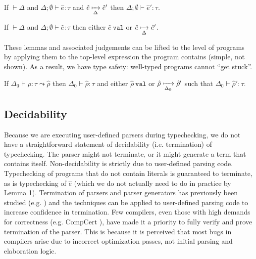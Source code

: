 \begin{lemma}[Preservation]
If $\vdash \Delta$ and $\Delta; \emptyset \vdash \hat{e} : \tau$ and  $\hat{e} \xmapsto[\Delta]{} \hat{e}'$ then $\Delta; \emptyset \vdash \hat{e}' : \tau$.
\end{lemma}
\begin{lemma}[Progress]
If  $\vdash \Delta$ and $\Delta; \emptyset \vdash \hat{e} : \tau$ then either $\hat{e}~\texttt{val}$ or $\hat{e} \xmapsto[\Delta]{} \hat{e}'$.
\end{lemma}
These lemmas and associated judgements can be lifted to the level of programs by applying them to the top-level expression the program contains (simple, not shown). As a result, we have type safety: well-typed programs cannot ``get stuck''.
\begin{theorem}
If $\Delta_0 \vdash \rho : \tau \leadsto \hat{\rho}$ then $\Delta_0 \vdash \hat{\rho} : \tau$ and either $\hat{\rho}~\texttt{val}$ or $\hat{\rho} \xmapsto[\Delta_0]{} \hat{\rho}'$ such that $\Delta_0 \vdash \hat{\rho}' : \tau$.
\end{theorem}
\subsection{Decidability}
Because we are executing user-defined parsers during typechecking, we do not have a straightforward statement of decidability (i.e. termination) of typechecking. The parser might not terminate, or it might generate a term that contains itself. Non-decidability is strictly due to user-defined parsing code. Typechecking of programs that do not contain literals is guaranteed to terminate, as is typechecking of $\hat{e}$ (which we do not actually need to do in practice by Lemma 1). Termination of parsers and parser generators has previously been studied (e.g. \cite{DBLP:conf/sle/KrishnanW12}) and the techniques can be applied to user-defined parsing code to increase confidence in termination. Few compilers, even those with high demands for correctness (e.g. CompCert \cite{Leroy-Compcert-CACM}), have made it a priority to fully verify and prove termination of the parser. This is because it is perceived that most bugs in compilers arise due to incorrect optimization passes, not initial parsing and elaboration logic.
